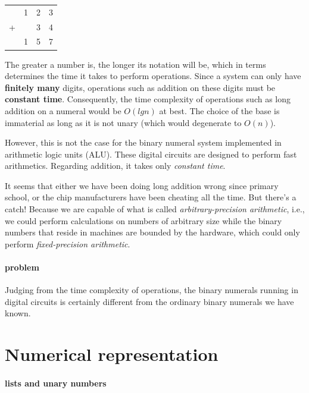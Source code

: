 \documentclass[../thesis.tex]{subfiles}
\begin{document}
\begin{center}
    \begin{tabular}{c@{\,}c@{\,}c@{\,}c}
      & 1 & 2 & 3 \\
    + &   & 3 & 4 \\
    \hline
      & 1 & 5 & 7 \\
    \end{tabular}
\end{center}

The greater a number is, the longer its notation will be, which in terms
determines the time it takes to perform operations.
Since a system can only have \textbf{finitely many} digits, operations such as
addition on these digits must be \textbf{constant time}.
Consequently, the time complexity of operations such as long addition on a
numeral would be $ O(lg n) $ at best.
The choice of the base is immaterial as long as it is not unary
(which would degenerate to $ O(n) $).

However, this is not the case for the binary numeral system implemented in
arithmetic logic units (ALU). These digital circuits are designed to perform
fast arithmetics. Regarding addition, it takes only \textit{constant time}.

It seems that either we have been doing long addition wrong since primary school,
or the chip manufacturers have been cheating all the time. But there's a catch!
Because we are capable of what is called \textit{arbitrary-precision arithmetic},
i.e., we could perform calculations on numbers of arbitrary size
while the binary numbers that reside in machines are bounded by the hardware,
which could only perform \textit{fixed-precision arithmetic}.

\paragraph{problem}
Judging from the time complexity of operations, the binary numerals running in
digital circuits is certainly different from the ordinary binary numerals we have
known.


\section{Numerical representation}

\paragraph{lists and unary numbers}
\end{document}
